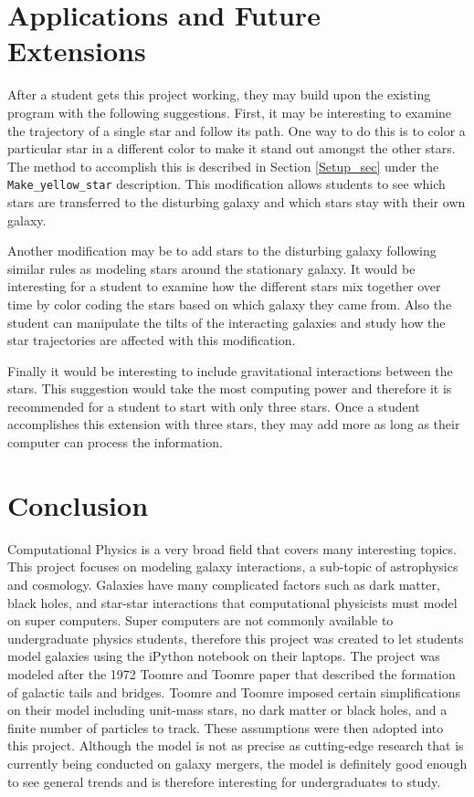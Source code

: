 \documentclass[11pt]{article}
\begin{document}
\section{Applications and Future Extensions}

After a student gets this project working, they may build upon the existing program with the following suggestions.  First, it may be interesting to examine the trajectory of a single star and follow its path.  One way to do this is to color a particular star in a different color to make it stand out amongst the other stars.  The method to accomplish this is described in Section \ref{Setup_sec} under the \texttt{Make\_yellow\_star} description. This modification allows students to see which stars are transferred to the disturbing galaxy and which stars stay with their own galaxy.  

Another modification may be to add stars to the disturbing galaxy following similar rules as modeling stars around the stationary galaxy.  It would be interesting for a student to examine how the different stars mix together over time by color coding the stars based on which galaxy they came from.  Also the student can manipulate the tilts of the interacting galaxies and study how the star trajectories are affected with this modification.  

Finally it would be interesting to include gravitational interactions between the stars.  This suggestion would take the most computing power and therefore it is recommended for a student to start with only three stars.  Once a student accomplishes this extension with three stars, they may add more as long as their computer can process the information. 

\section{Conclusion}

Computational Physics is a very broad field that covers many interesting topics.  This project focuses on modeling galaxy interactions, a sub-topic of astrophysics and cosmology.  Galaxies have many complicated factors such as dark matter, black holes, and star-star interactions that computational physicists must model on super computers. Super computers are not commonly available to undergraduate physics students, therefore this project was created to let students model galaxies using the iPython notebook on their laptops.  The project was modeled after the 1972 Toomre and Toomre paper that described the formation of galactic tails and bridges.  Toomre and Toomre imposed certain simplifications on their model including unit-mass stars, no dark matter or black holes, and a finite number of particles to track.  These assumptions were then adopted into this project.  Although the model is not as precise as  cutting-edge research that is currently being conducted on galaxy mergers, the model is definitely good enough to see general trends and is therefore interesting for undergraduates to study.   
\end{document}
